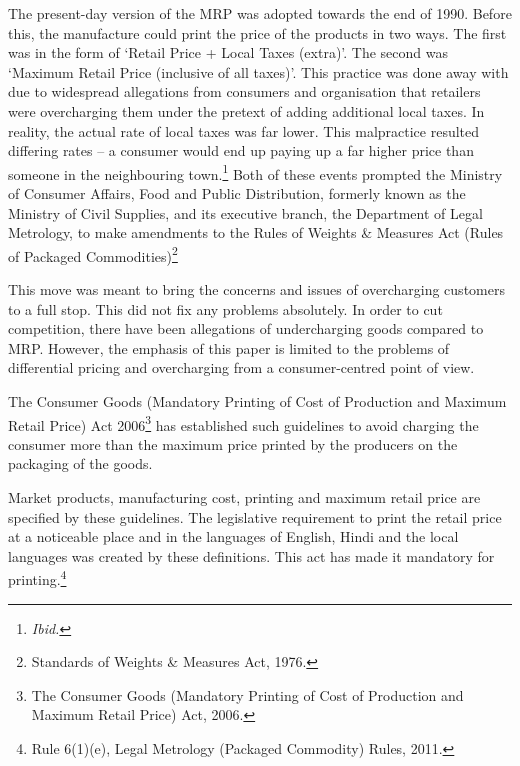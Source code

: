 \begin{multicols}{2}
\vspace{-.1cm}

\noi
The present-day version of the MRP was adopted towards the end of 1990. Before this, the
manufacture could print the price of the products in two ways. The first was in the form of
‘Retail Price + Local Taxes (extra)’. The second was ‘Maximum Retail Price (inclusive of all
taxes)’. This practice was done away with due to widespread allegations from consumers and
organisation that retailers were overcharging them under the pretext of adding additional local
taxes. In reality, the actual rate of local taxes was far lower. This malpractice resulted differing
rates – a consumer would end up paying up a far higher price than someone in the neighbouring
town.\footnote{\textit{Ibid.}} Both of these events prompted the Ministry of Consumer Affairs, Food and Public
Distribution, formerly known as the Ministry of Civil Supplies, and its executive branch, the
Department of Legal Metrology, to make amendments to the Rules of Weights \& Measures
Act (Rules of Packaged Commodities)\footnote{Standards of Weights \& Measures Act, 1976.}

\vspace{-.1cm}

\noi
This move was meant to bring the concerns and issues of overcharging customers to a full stop.
This did not fix any problems absolutely. In order to cut competition, there have been allegations of undercharging goods compared to MRP. However, the emphasis of this paper is
limited to the problems of differential pricing and overcharging from a consumer-centred point
of view.

\vspace{-.1cm}

\noi
The Consumer Goods (Mandatory Printing of Cost of Production and Maximum Retail Price)
Act 2006\footnote{The Consumer Goods (Mandatory Printing of Cost of Production and Maximum Retail Price) Act, 2006.} has established such guidelines to avoid charging the consumer more than the
maximum price printed by the producers on the packaging of the goods.

\vspace{-.1cm}

\noi
Market products, manufacturing cost, printing and maximum retail price are specified by these
guidelines. The legislative requirement to print the retail price at a noticeable place and in the
languages of English, Hindi and the local languages was created by these definitions. This act
has made it mandatory for printing.\footnote{Rule 6(1)(e), Legal Metrology (Packaged Commodity) Rules, 2011.}


\end{multicols}
